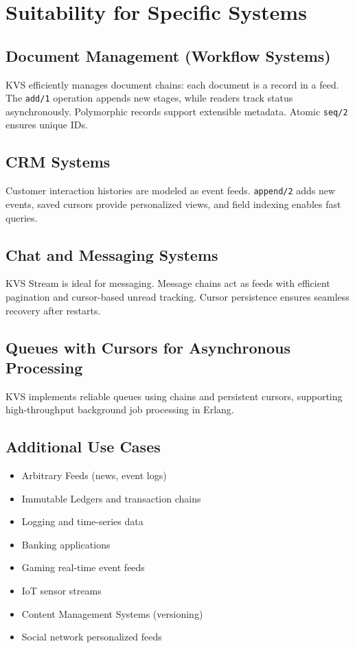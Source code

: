 \documentclass[11pt,a4paper]{article}
\begin{document}
\section{Suitability for Specific Systems}

\subsection{Document Management (Workflow Systems)}

KVS efficiently manages document chains: each document is a record in a feed. The \texttt{add/1} operation appends new stages, while readers track status asynchronously. Polymorphic records support extensible metadata. Atomic \texttt{seq/2} ensures unique IDs.

\subsection{CRM Systems}

Customer interaction histories are modeled as event feeds. \texttt{append/2} adds new events, saved cursors provide personalized views, and field indexing enables fast queries.

\subsection{Chat and Messaging Systems}

KVS Stream is ideal for messaging. Message chains act as feeds with efficient pagination and cursor-based unread tracking. Cursor persistence ensures seamless recovery after restarts.

\subsection{Queues with Cursors for Asynchronous Processing}

KVS implements reliable queues using chains and persistent cursors, supporting high-throughput background job processing in Erlang.

\subsection{Additional Use Cases}

\begin{itemize}
    \item Arbitrary Feeds (news, event logs)
    \item Immutable Ledgers and transaction chains
    \item Logging and time-series data
    \item Banking applications
    \item Gaming real-time event feeds
    \item IoT sensor streams
    \item Content Management Systems (versioning)
    \item Social network personalized feeds
\end{itemize}
\end{document}
